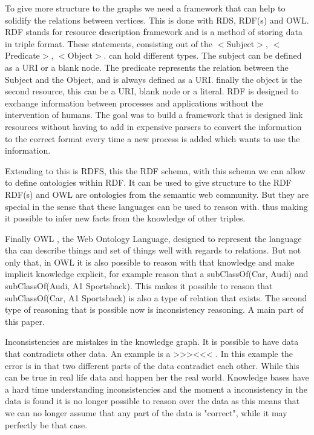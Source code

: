 \documentclass{article}
\begin{document}
To give more structure to the graphs we need a framework that can help to solidify the relations between vertices. This is done with RDS, RDF(s) and OWL.\\
RDF \cite{rdfPrimer:2014} stands for \textbf{r}esource \textbf{d}escription \textbf{f}ramework and is a method of storing data in triple format. These statements, consisting out of the $<$Subject$>$, $<$Predicate$>$, $<$Object$>$. can hold different types. The subject can be defined as a URI or a blank node. The predicate represents the relation between the Subject and the Object, and is always defined as a URI. finally the object is the second resource, this can be a URI, blank node or a literal.
RDF is designed to exchange information between processes and applications without the intervention of humans. The goal was to build a framework that is designed link resources without having to add in expensive parsers to convert the information to the correct format every time a new process is added which wants to use the information.

Extending to this is RDFS, this the RDF schema, with this schema we can allow to define ontologies within RDF. It can be used to give structure to the RDF
RDF(s) and OWL are ontologies from the semantic web community. But they are special in the sense that these languages can be used to reason with. thus making it possible to infer new facts from the knowledge of other triples.

Finally OWL \cite{OWLPrimer:2012}, the Web Ontology Language, designed to represent the language tha can describe things and set of things well with regards to relations. But not only that, in OWL it is also possible to reason with that knowledge and make implicit knowledge explicit, for example reason that a subClassOf(Car, Audi) and subClassOf(Audi, A1 Sportsback). This makes it possible to reason that subClassOf(Car, A1 Sportsback) is also a type of relation that exists. The second type of reasoning that is possible now is inconsistency reasoning. A main part of this paper.

Inconsistencies are mistakes in the knowledge graph. It is possible to have data that contradicts other data. An example is a >>><<< . In this example the error is in that two different parts of the data contradict each other. While this can be true in real life data and happen her the real world. Knowledge bases have a hard time understanding inconsistencies and the moment a inconsistency in the data is found it is no longer possible to reason over the data as this means that we can no longer assume that any part of the data is "correct", while it may perfectly be that case.\\
\end{document}

